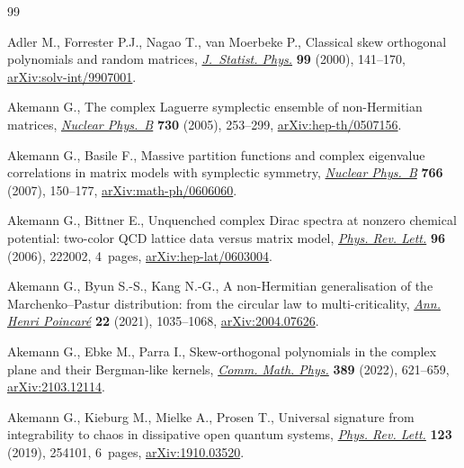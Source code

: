 \documentclass[pdftex]{sigma}
\numberwithin{equation}{section}
\newcommand{\1}{\chi}
\begin{document}
\begin{thebibliography}{99}
\footnotesize\itemsep=0pt

Adler M., Forrester P.J., Nagao T., van Moerbeke P., Classical skew orthogonal
 polynomials and random matrices, \href{https://doi.org/10.1023/A:1018644606835}{\textit{J.~Statist. Phys.}} \textbf{99}
 (2000), 141--170, \href{https://arxiv.org/abs/solv-int/9907001}{arXiv:solv-int/9907001}.

Akemann G., The complex {L}aguerre symplectic ensemble of non-{H}ermitian
 matrices, \href{https://doi.org/10.1016/j.nuclphysb.2005.09.039}{\textit{Nuclear Phys.~B}} \textbf{730} (2005), 253--299,
 \href{https://arxiv.org/abs/hep-th/0507156}{arXiv:hep-th/0507156}.

Akemann G., Basile F., Massive partition functions and complex eigenvalue
 correlations in matrix models with symplectic symmetry, \href{https://doi.org/10.1016/j.nuclphysb.2006.12.008}{\textit{Nuclear
 Phys.~B}} \textbf{766} (2007), 150--177, \href{https://arxiv.org/abs/math-ph/0606060}{arXiv:math-ph/0606060}.

Akemann G., Bittner E., Unquenched complex {D}irac spectra at nonzero chemical
 potential: two-color {QCD} lattice data versus matrix model, \href{https://doi.org/10.1103/physrevlett.96.222002}{\textit{Phys.
 Rev. Lett.}} \textbf{96} (2006), 222002, 4~pages, \href{https://arxiv.org/abs/hep-lat/0603004}{arXiv:hep-lat/0603004}.

Akemann G., Byun S.-S., Kang N.-G., A non-{H}ermitian generalisation of the
 {M}archenko--{P}astur distribution: from the circular law to
 multi-criticality, \href{https://doi.org/10.1007/s00023-020-00973-7}{\textit{Ann. Henri Poincar\'e}} \textbf{22} (2021),
 1035--1068, \href{https://arxiv.org/abs/2004.07626}{arXiv:2004.07626}.

Akemann G., Ebke M., Parra I., Skew-orthogonal polynomials in the complex plane
 and their {B}ergman-like kernels, \href{https://doi.org/10.1007/s00220-021-04230-8}{\textit{Comm. Math. Phys.}} \textbf{389}
 (2022), 621--659, \href{https://arxiv.org/abs/2103.12114}{arXiv:2103.12114}.

Akemann G., Kieburg M., Mielke A., Prosen T., Universal signature from
 integrability to chaos in dissipative open quantum systems, \href{https://doi.org/10.1103/physrevlett.123.254101}{\textit{Phys.
 Rev. Lett.}} \textbf{123} (2019), 254101, 6~pages, \href{https://arxiv.org/abs/1910.03520}{arXiv:1910.03520}.


\end{thebibliography}
\end{document}
